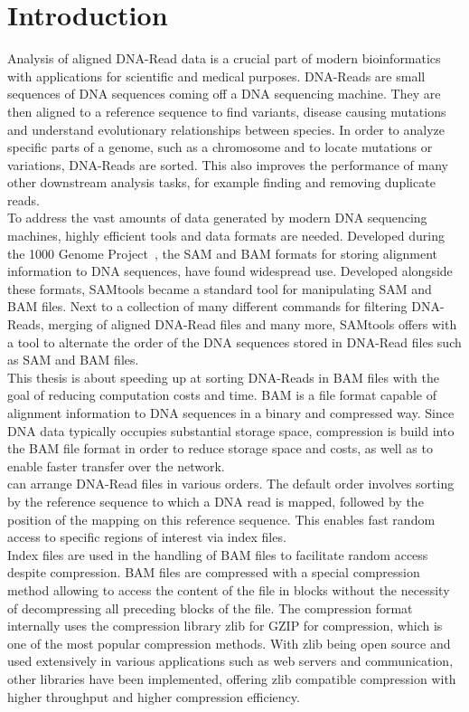 \section{Introduction}
Analysis of aligned DNA-Read data is a crucial part of modern bioinformatics with applications for scientific and medical purposes. DNA-Reads are small sequences of DNA sequences coming off a DNA sequencing machine. They are then aligned to a reference sequence to find variants, disease causing mutations and understand evolutionary relationships between species. In order to analyze specific parts of a genome, such as a chromosome and to locate mutations or variations, DNA-Reads are sorted. This also improves the performance of many other downstream analysis tasks, for example finding and removing duplicate reads. \\

To address the vast amounts of data generated by modern DNA sequencing machines, highly efficient tools and data formats are needed. Developed during the 1000 Genome Project~\cite{the_1000_genomes_project_consortium_1000_2012}, the SAM and BAM formats for storing alignment information to DNA sequences, have found widespread use. Developed alongside these formats, SAMtools became a standard tool for manipulating SAM and BAM files. Next to a collection of many different commands for filtering DNA-Reads, merging of aligned DNA-Read files and many more, SAMtools offers with \sort a tool to alternate the order of the DNA sequences stored in DNA-Read files such as SAM and BAM files. \\

This thesis is about speeding up \sort at sorting DNA-Reads in BAM files with the goal of reducing computation costs and time. BAM is a file format capable of alignment information to DNA sequences in a binary and compressed way. Since DNA data typically occupies substantial storage space, compression is build into the BAM file format in order to reduce storage space and costs, as well as to enable faster transfer over the network.\\

\sort can arrange DNA-Read files in various orders. The default order involves sorting by the reference sequence to which a DNA read is mapped, followed by the position of the mapping on this reference sequence. This enables fast random access to specific regions of interest via index files. \\

Index files are used in the handling of BAM files to facilitate random access despite compression. BAM files are compressed with a special compression method allowing to access the content of the file in blocks without the necessity of decompressing all preceding blocks of the file. The compression format internally uses the compression library zlib for GZIP for compression, which is one of the most popular compression methods. With zlib being open source and used extensively in various applications such as web servers and communication, other libraries have been implemented, offering zlib compatible compression with higher throughput and higher compression efficiency. \\

